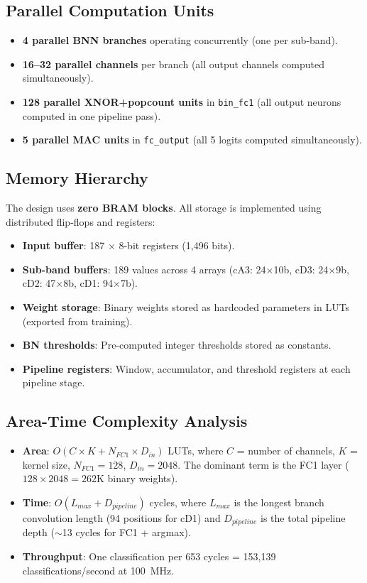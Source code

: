 \documentclass[conference]{IEEEtran}
\begin{document}
\subsection{Parallel Computation Units}

\begin{itemize}
    \item \textbf{4 parallel BNN branches} operating concurrently (one per sub-band).
    \item \textbf{16--32 parallel channels} per branch (all output channels computed simultaneously).
    \item \textbf{128 parallel XNOR+popcount units} in \texttt{bin\_fc1} (all output neurons computed in one pipeline pass).
    \item \textbf{5 parallel MAC units} in \texttt{fc\_output} (all 5 logits computed simultaneously).
\end{itemize}

\subsection{Memory Hierarchy}

The design uses \textbf{zero BRAM blocks}. All storage is implemented using distributed flip-flops and registers:
\begin{itemize}
    \item \textbf{Input buffer}: 187 $\times$ 8-bit registers (1,496 bits).
    \item \textbf{Sub-band buffers}: 189 values across 4 arrays (cA3: 24$\times$10b, cD3: 24$\times$9b, cD2: 47$\times$8b, cD1: 94$\times$7b).
    \item \textbf{Weight storage}: Binary weights stored as hardcoded parameters in LUTs (exported from training).
    \item \textbf{BN thresholds}: Pre-computed integer thresholds stored as constants.
    \item \textbf{Pipeline registers}: Window, accumulator, and threshold registers at each pipeline stage.
\end{itemize}

\subsection{Area-Time Complexity Analysis}

\begin{itemize}
    \item \textbf{Area}: $O(C \times K + N_{FC1} \times D_{in})$ LUTs, where $C$ = number of channels, $K$ = kernel size, $N_{FC1} = 128$, $D_{in} = 2048$. The dominant term is the FC1 layer ($128 \times 2048 = 262$K binary weights).
    \item \textbf{Time}: $O(L_{max} + D_{pipeline})$ cycles, where $L_{max}$ is the longest branch convolution length (94 positions for cD1) and $D_{pipeline}$ is the total pipeline depth ($\sim$13 cycles for FC1 + argmax).
    \item \textbf{Throughput}: One classification per 653 cycles = 153,139 classifications/second at 100~MHz.
\end{itemize}
\end{document}
